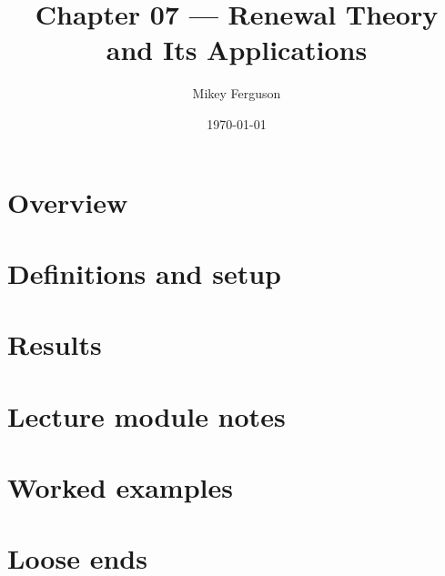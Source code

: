 \documentclass[11pt]{article}
\title{Chapter 07 --- Renewal Theory and Its Applications}
\author{Mikey Ferguson}
\date{\today}
\begin{document}
\maketitle
\tableofcontents
\bigskip

\section{Overview}

\section{Definitions and setup}

\section{Results}

\section{Lecture module notes}

\section{Worked examples}

\section{Loose ends}
\end{document}
